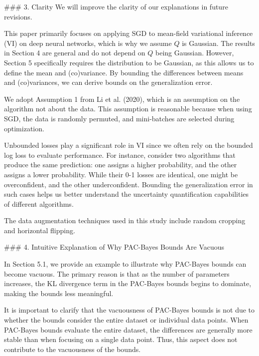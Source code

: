 \documentclass{article}
\begin{document}
\begin{markdown}
### 3. Clarity
We will improve the clarity of our explanations in future revisions.

This paper primarily focuses on applying SGD to mean-field variational inference (VI) on deep neural networks, which is why we assume $Q$ is Gaussian. The results in Section 4 are general and do not depend on $Q$ being Gaussian. However, Section 5 specifically requires the distribution to be Gaussian, as this allows us to define the mean and (co)variance. By bounding the differences between means and (co)variances, we can derive bounds on the generalization error.

We adopt Assumption 1 from Li et al. (2020), which is an assumption on the algorithm not about the data.
This assumption is reasonable because when using SGD, the data is randomly permuted, and mini-batches are selected during optimization.

Unbounded losses play a significant role in VI since we often rely on the bounded log loss to evaluate performance. For instance, consider two algorithms that produce the same prediction: one assigns a higher probability, and the other assigns a lower probability. While their 0-1 losses are identical, one might be overconfident, and the other underconfident. Bounding the generalization error in such cases helps us better understand the uncertainty quantification capabilities of different algorithms.

The data augmentation techniques used in this study include random cropping and horizontal flipping.

### 4. Intuitive Explanation of Why PAC-Bayes Bounds Are Vacuous  

In Section 5.1, we provide an example to illustrate why PAC-Bayes bounds can become vacuous. The primary reason is that as the number of parameters increases, the KL divergence term in the PAC-Bayes bounds begins to dominate, making the bounds less meaningful.  

It is important to clarify that the vacuousness of PAC-Bayes bounds is not due to whether the bounds consider the entire dataset or individual data points. When PAC-Bayes bounds evaluate the entire dataset, the differences are generally more stable than when focusing on a single data point. Thus, this aspect does not contribute to the vacuousness of the bounds.
\end{markdown}
\end{document}
